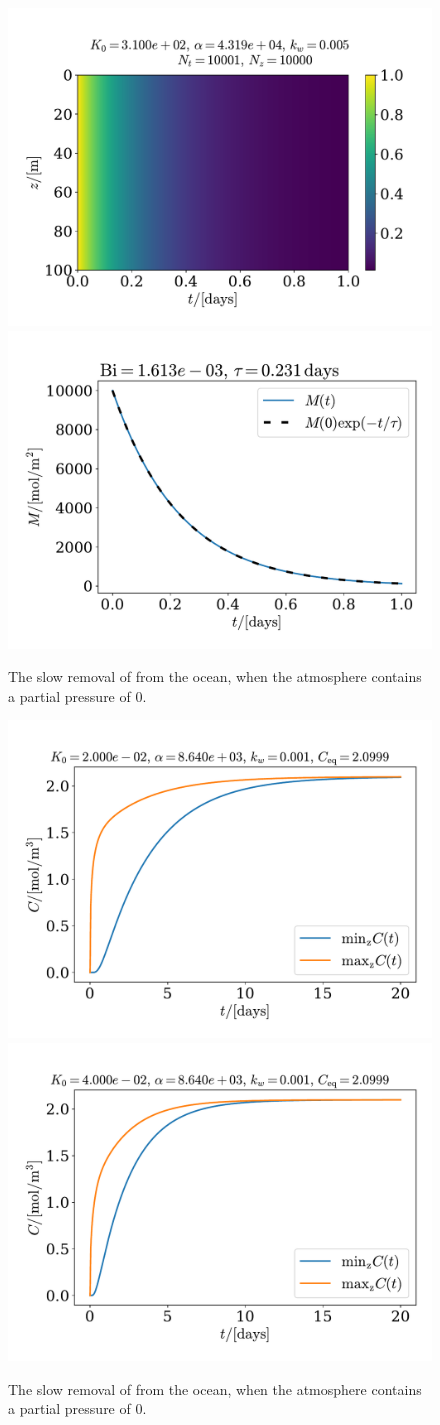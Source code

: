 \documentclass{article}
\begin{document}
    \begin{figure}
        \centering
        \includegraphics[width=.49\textwidth]{../plots/test4}
        \includegraphics[width=.49\textwidth]{../plots/test4_decay}
        \caption{The slow removal of  from the ocean, when the atmosphere contains a partial pressure of 0.}
        \label{decay}
    \end{figure}

    \begin{figure}
        \centering
        \includegraphics[width=.49\textwidth]{../plots/test5_minmax}
        \includegraphics[width=.49\textwidth]{../plots/test5_varK_minmax}
        \label{decay}
        \caption{The slow removal of  from the ocean, when the atmosphere contains a partial pressure of 0.}
    \end{figure}

    
    
\end{document}
